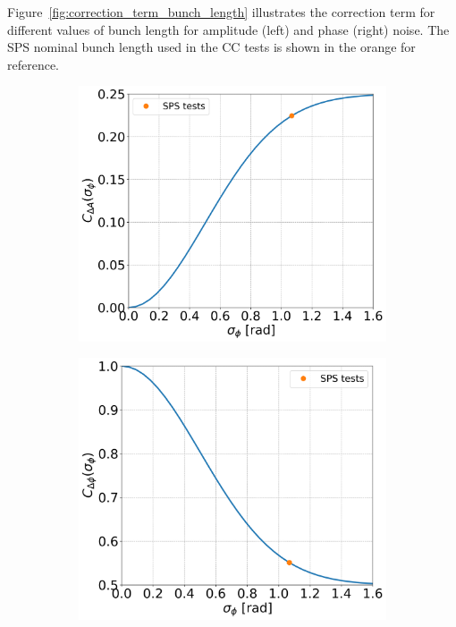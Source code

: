 Figure~\ref{fig:correction_term_bunch_length} illustrates the correction term for different values of bunch length for amplitude (left) and phase (right) noise. The SPS nominal bunch length used in the CC tests is shown in the orange for reference.

\begin{figure}[!ht]
    \centering
    \begin{subfigure}[t]{0.45\textwidth}
        \centering
        \includegraphics[width=1\textwidth]{images/Ch3/CA_bunch_length_dependence.png}
    \end{subfigure}
    \hfill
    \begin{subfigure}[t]{0.45\textwidth}
        \centering
        \includegraphics[width=1\textwidth]{images/Ch3/Cphi_bunch_length_dependence.png}

\end{subfigure}
\end{figure}
